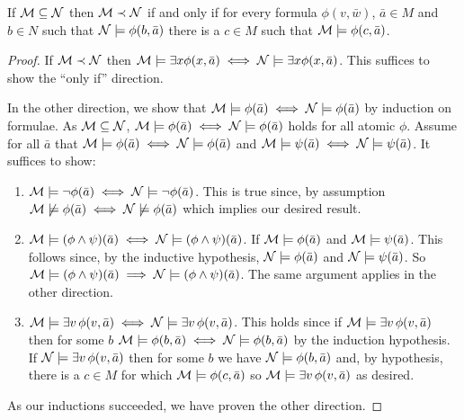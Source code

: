 \begin{theorem}\label{theorem_tarski_vaught_test}
If \(\mathcal{M} \subseteq \mathcal{N}\) then \(\mathcal{M} \prec \mathcal{N}\) if and only if for every formula \(\phi(v, \bar{w})\), \(\bar{a} \in M\) and \(b \in N\) such that \(\mathcal{N} \models \phi(b, \bar{a})\) there is a \(c \in M\) such that \(\mathcal{M} \models \phi(c, \bar{a})\).
\end{theorem}

\begin{proof}
If \(\mathcal{M} \prec \mathcal{N}\) then \(\mathcal{M} \models \exists x \phi(x, \bar{a}) \iff \mathcal{N} \models \exists x \phi(x, \bar{a})\). This suffices to show the ``only if'' direction.

In the other direction, we show that \(\mathcal{M} \models \phi(\bar{a}) \iff \mathcal{N} \models \phi(\bar{a})\) by induction on formulae. 
As \(\mathcal{M} \subseteq \mathcal{N}\), \(\mathcal{M} \models \phi(\bar{a}) \iff \mathcal{N} \models \phi(\bar{a})\) holds for all atomic \(\phi\).
Assume for all \(\bar{a}\) that  \(\mathcal{M} \models \phi(\bar{a}) \iff \mathcal{N} \models \phi(\bar{a})\) and \(\mathcal{M} \models \psi(\bar{a}) \iff \mathcal{N} \models \psi(\bar{a})\).
It suffices to show:
\begin{enumerate}
\item \(\mathcal{M} \models \neg \phi(\bar{a}) \iff \mathcal{N} \models \neg \phi(\bar{a})\). This is true since, by assumption \(\mathcal{M} \not \models \phi(\bar{a}) \iff \mathcal{N} \not \models \phi(\bar{a})\) which implies our desired result. 
\item \(\mathcal{M} \models (\phi\land\psi)(\bar{a}) \iff \mathcal{N} \models (\phi\land\psi)(\bar{a})\). If \(\mathcal{M} \models \phi(\bar{a})\) and \(\mathcal{M} \models \psi(\bar{a})\). This follows since, by the inductive hypothesis,  \(\mathcal{N} \models \phi(\bar{a})\) and \(\mathcal{N} \models \psi(\bar{a})\). So \(\mathcal{M} \models (\phi \land \psi)(\bar{a}) \implies \mathcal{N} \models (\phi \land \psi)(\bar{a})\). The same argument applies in the other direction. 
\item \(\mathcal{M} \models \exists v \, \phi(v, \bar{a}) \iff \mathcal{N} \models \exists v \, \phi(v, \bar{a})\). This holds since if \(\mathcal{M} \models \exists v \, \phi(v, \bar{a})\) then for some \(b\) \(\mathcal{M} \models \phi(b, \bar{a}) \iff \mathcal{N} \models \phi(b, \bar{a})\) by the induction hypothesis. If \(\mathcal{N} \models \exists v \, \phi(v, \bar{a})\) then for some \(b\) we have \(\mathcal{N} \models \phi(b, \bar{a})\) and, by hypothesis, there is a \(c \in M\) for which \(\mathcal{M} \models \phi(c, \bar{a})\) so \(\mathcal{M} \models \exists v\, \phi(v, \bar{a})\) as desired.    
\end{enumerate} 
As our inductions succeeded, we have proven the other direction. 
\end{proof}

